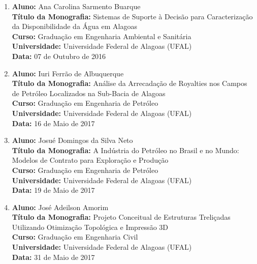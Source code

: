 \documentclass[a4paper,oneside,10pt]{article}
\begin{document}
\begin{enumerate}
\renewcommand{\labelenumi}{{\large\bfseries\arabic{enumi}.}}
\vspace{0.3cm}

\item       \textbf{Aluno:} Ana Carolina Sarmento Buarque \mbox{}\\
            \textbf{Título da Monografia:} Sistemas de Suporte à Decisão para Caracterização da Disponibilidade da Água em Alagoas\\
            \textbf{Curso:} Graduação em Engenharia Ambiental e Sanitária\\
            \textbf{Universidade:} Universidade Federal de Alagoas (UFAL)\\
            \textbf{Data:} 07 de Outubro de 2016\\

   \item       \textbf{Aluno:} Iuri Ferrão de Albuquerque \mbox{}\\
            \textbf{Título da Monografia:} Análise da Arrecadação de Royalties nos Campos de Petróleo Localizados na Sub-Bacia de Alagoas\\
            \textbf{Curso:} Graduação em Engenharia de Petróleo\\
            \textbf{Universidade:} Universidade Federal de Alagoas (UFAL)\\
            \textbf{Data:} 16 de Maio de 2017\\
            
\item       \textbf{Aluno:} Josué Domingos da Silva Neto \mbox{}\\
            \textbf{Título da Monografia:} A Indústria do Petróleo no Brasil e no Mundo: Modelos de Contrato para Exploração e Produção\\
            \textbf{Curso:} Graduação em Engenharia de Petróleo\\
            \textbf{Universidade:} Universidade Federal de Alagoas (UFAL)\\
            \textbf{Data:} 19 de Maio de 2017\\
            
            \item       \textbf{Aluno:} José Adeilson Amorim \mbox{}\\
            \textbf{Título da Monografia:} Projeto Conceitual de Estruturas Treliçadas Utilizando Otimização Topológica e Impressão 3D\\
            \textbf{Curso:} Graduação em Engenharia Civil\\
            \textbf{Universidade:} Universidade Federal de Alagoas (UFAL)\\
            \textbf{Data:} 31 de Maio de 2017\\
            

\end{enumerate}
\end{document}
